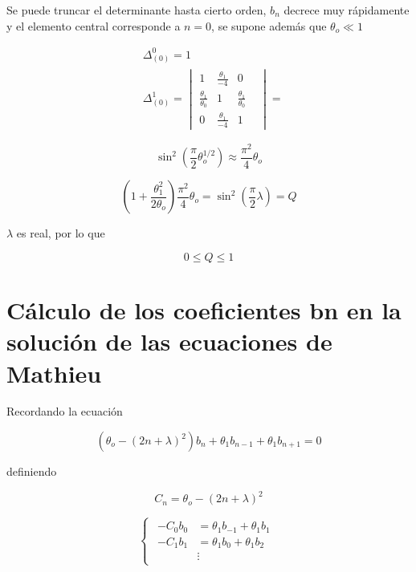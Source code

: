 Se puede truncar el determinante hasta cierto orden, $b_n$ decrece muy rápidamente y el elemento central corresponde a $n=0$, se supone además que $\theta_o \ll 1$ 

\begin{equation}\label{eq:E.40}
\begin{aligned}
& \Delta_{(0)}^0=1 \\
& \Delta_{(0)}^1=
\begin{vmatrix}
 1 & \frac{\theta_1}{-4} & 0 \\ 
\frac{\theta_1}{\theta_0} & 1 & \frac{\theta_1}{\theta_0}  \\
 0 & \frac{\theta_1}{-4} & 1 &  
\end{vmatrix}
= 
\end{aligned}
\end{equation}

\begin{equation}\label{eq:E.41}
\sin^2(\frac{\pi}{2}\theta_o^{1/2}) \approx \frac{\pi^2}{4}\theta_o
\end{equation}

\begin{equation}\label{eq:E.42}
(1+\frac{\theta_1^2}{2\theta_o})\frac{\pi^2}{4}\theta_o=\sin^2(\frac{\pi}{2}\lambda) = Q
\end{equation}

$\lambda$ es real, por lo que 

\begin{equation}\label{eq:E.43}
0 \leq Q \leq 1
\end{equation}


\section{Cálculo de los coeficientes bn en la solución de las ecuaciones de Mathieu}

Recordando la ecuación

\begin{equation}\label{eq:E.44}
(\theta_o-(2n+\lambda)^2)b_n+\theta_1b_{n-1}+\theta_1b_{n+1}=0
\end{equation}

definiendo 

\begin{equation}\label{eq:E.45}
C_n=\theta_o-(2n+\lambda)^2
\end{equation}

\begin{equation}\label{eq:E.46}
\begin{cases}
\begin{aligned}
-C_0b_0&=\theta_1b_{-1}+\theta_1b_{1}\\
-C_1b_1&=\theta_1b_{0}+\theta_1b_{2}\\
& \vdots
\end{aligned}
\end{cases}
\end{equation}


